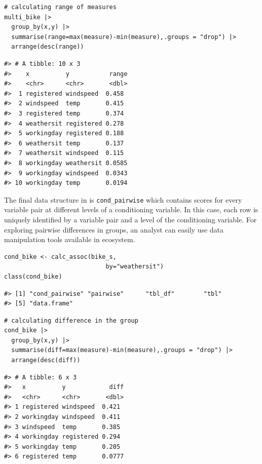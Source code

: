 \begin{verbatim}
# calculating range of measures
multi_bike |> 
  group_by(x,y) |>
  summarise(range=max(measure)-min(measure),.groups = "drop") |>
  arrange(desc(range))
\end{verbatim}

\begin{verbatim}
#> # A tibble: 10 x 3
#>    x          y           range
#>    <chr>      <chr>       <dbl>
#>  1 registered windspeed  0.458 
#>  2 windspeed  temp       0.415 
#>  3 registered temp       0.374 
#>  4 weathersit registered 0.278 
#>  5 workingday registered 0.188 
#>  6 weathersit temp       0.137 
#>  7 weathersit windspeed  0.115 
#>  8 workingday weathersit 0.0585
#>  9 workingday windspeed  0.0343
#> 10 workingday temp       0.0194
\end{verbatim}

The final data structure in  is \texttt{cond\_pairwise} which contains scores for every variable pair at different levels of a conditioning variable. In this case, each row is uniquely identified by a variable pair and a level of the conditioning variable. For exploring pairwise differences in groups, an analyst can easily use data manipulation tools available in  ecosystem.

\begin{verbatim}
cond_bike <- calc_assoc(bike_s,
                            by="weathersit")
class(cond_bike)
\end{verbatim}

\begin{verbatim}
#> [1] "cond_pairwise" "pairwise"      "tbl_df"        "tbl"          
#> [5] "data.frame"
\end{verbatim}

\begin{verbatim}
# calculating difference in the group
cond_bike |> 
  group_by(x,y) |>
  summarise(diff=max(measure)-min(measure),.groups = "drop") |>
  arrange(desc(diff))
\end{verbatim}

\begin{verbatim}
#> # A tibble: 6 x 3
#>   x          y            diff
#>   <chr>      <chr>       <dbl>
#> 1 registered windspeed  0.421 
#> 2 workingday windspeed  0.411 
#> 3 windspeed  temp       0.385 
#> 4 workingday registered 0.294 
#> 5 workingday temp       0.205 
#> 6 registered temp       0.0777
\end{verbatim}

